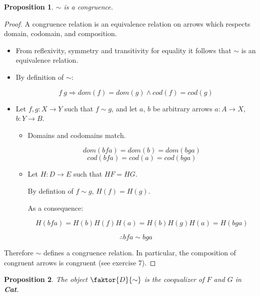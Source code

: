 \documentclass[a4paper,notitlepage]{article}
\newtheorem{proposition}{Proposition}
\begin{document}
\begin{enumerate}
    \begin{proposition}
    $\sim$ is a congruence.
    \end{proposition}
    \begin{proof}

      A congruence relation is an equivalence relation on arrows which
      respects domain, codomain, and composition.

    \begin{itemize}
      \item From reflexivity, symmetry and transitivity for equality
        it follows that $\sim$ is an equivalence relation.           

          \item By definition of $\sim$:

            $$f ~ g \Rightarrow dom(f) = dom(g) \wedge cod(f) = cod(g)$$ 

        \item
          Let $f , g : X → Y$ such that $f \sim g$, and let $a$, $b$ be arbitrary
          arrows $a : A → X$, $b : Y → B$.

          \begin{itemize}

           \item Domains and codomains match.

               $$dom(bfa) = dom(b) = dom(bga)$$
               $$cod(bfa) = cod(a) = cod(bga)$$

            \item
              
              Let $H : D → E$ such that $HF = HG$.

              By defintion of $f \sim g$, $H(f) = H(g)$.

              As a consequence:

              $$H(bfa) = H(b)H(f)H(a) = H(b)H(g)H(a) = H(bga)$$
              
          \end{itemize}

          $$ \therefore bfa \sim bga $$
    \end{itemize}

    Therefore $\sim$ defines a congruence relation.
    In particular, the composition of congruent arrows is congruent
    (see exercise 7).

    \end{proof}

    \begin{proposition}
    The object $\faktor{D}{\sim}$ is the coequalizer of $F$ and
    $G$ in {\bf Cat}.
    \end{proposition}


\end{enumerate}
\end{document}
